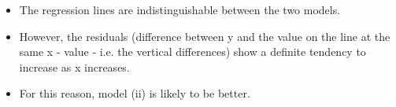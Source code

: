\documentclass[a4paper,12pt]{article}
\begin{document}
\begin{enumerate}[(i)]
\begin{itemize}
\item The regression lines are indistinguishable between the two models. 
\item However,
the residuals (difference between y and the value on the line at the same x
- value - i.e. the vertical differences) show a definite tendency to increase as
x increases.
\item For this reason, model (ii) is likely to be better.
\end{itemize}
\end{enumerate}
\end{document}

